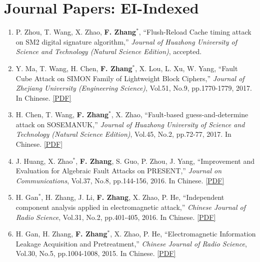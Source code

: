\documentclass[11pt]{article}
\begin{document}
\section*{Journal Papers: EI-Indexed}
\begin{enumerate}


\item P. Zhou, T. Wang, X. Zhao, {\bf F. Zhang}$^\ast$, ``Flush-Reload Cache timing attack on SM2 digital signature algorithm,'' {\it Journal of Huazhong University of Science and Technology (Natural Science Edition)}, {\color{blue}accepted}.

\item Y. Ma, T. Wang, H. Chen, {\bf F. Zhang}$^\ast$, X. Lou, L. Xu, W. Yang, ``Fault Cube Attack on SIMON Family of Lightweight Block Ciphers,'' {\it Journal of Zhejiang University (Engineering Science)}, Vol.51, No.9, pp.1770-1779, 2017. In Chinese. \href{http://www.isee.zju.edu.cn/fanzhang/publications/2017\_JoZJU\_SIMON.pdf}{[PDF]}

\item H. Chen, T. Wang, {\bf F. Zhang}$^\ast$, X. Zhao, ``Fault-based guess-and-determine attack on SOSEMANUK,'' {\it Journal of Huazhong University of Science and Technology (Natural Science Edition)}, Vol.45, No.2, pp.72-77, 2017. In Chinese. \href{http://www.isee.zju.edu.cn/fanzhang/publications/2017\_JoHUST\_SOSEMANUK.pdf}{[PDF]}

\item J. Huang, X. Zhao$^\ast$, {\bf F. Zhang}, S. Guo, P. Zhou, J. Yang, ``Improvement and Evaluation for Algebraic Fault Attacks on PRESENT,'' {\it Journal on Communications}, Vol.37, No.8, pp.144-156, 2016. In Chinese. \href{http://www.isee.zju.edu.cn/fanzhang/publications/2016\_JoComm\_PRESENT.pdf}{[PDF]}

\item H. Gan$^\ast$, H. Zhang, J. Li, {\bf F. Zhang}, X. Zhao, P. He, ``Independent component analysis applied in electromagnetic attack,'' {\it Chinese Journal of Radio Science}, Vol.31, No.2, pp.401-405, 2016. In Chinese. \href{http://www.isee.zju.edu.cn/fanzhang/publications/2016\_CJRS\_ICA.pdf}{[PDF]}

\item H. Gan, H. Zhang, {\bf F. Zhang}$^\ast$, X. Zhao, P. He, ``Electromagnetic Information Leakage Acquisition and Pretreatment,'' {\it Chinese Journal of Radio Science}, Vol.30, No.5, pp.1004-1008, 2015. In Chinese. \href{http://www.isee.zju.edu.cn/fanzhang/publications/2015\_CJRS\_EM.pdf}{[PDF]}


\end{enumerate}
\end{document}
